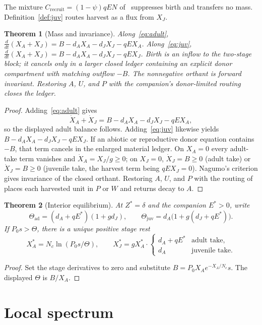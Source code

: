 \documentclass[11pt]{article}
\newtheorem{theorem}{Theorem}
\theoremstyle{definition}
\begin{document}
The mixture $C_{\mathrm{recruit}}=(1-\psi)qEN$ of~\cite{paperI} suppresses birth and transfers no mass. Definition~\ref{def:juv} routes harvest as a flux from $X_J$.

\begin{theorem}[Mass and invariance]
\label{thm:mass}
Along~\eqref{eq:adult}, $\frac{d}{dt}(X_A+X_J)=B-d_A X_A-d_J X_J-qEX_A$. Along~\eqref{eq:juv}, $\frac{d}{dt}(X_A+X_J)=B-d_A X_A-d_J X_J-qEX_J$. Birth is an inflow to the two-stage block; it cancels only in a larger closed ledger containing an explicit donor compartment with matching outflow $-B$. The nonnegative orthant is forward invariant. Restoring $A$, $U$, and $P$ with the companion's donor-limited routing closes the ledger.
\end{theorem}

\begin{proof}
Adding~\eqref{eq:adult} gives
\[
\dot X_A+\dot X_J=B-d_A X_A-d_J X_J-qEX_A,
\]
so the displayed adult balance follows. Adding~\eqref{eq:juv} likewise yields $B-d_A X_A-d_J X_J-qEX_J$. If an abiotic or reproductive donor equation contains $-B$, that term cancels in the enlarged material ledger. On $X_A=0$ every adult-take term vanishes and $\dot X_A=X_J/g\ge 0$; on $X_J=0$, $\dot X_J=B\ge 0$ (adult take) or $\dot X_J=B\ge 0$ (juvenile take, the harvest term being $qEX_J=0$). Nagumo's criterion \cite{nagumo1942} gives invariance of the closed orthant. Restoring $A$, $U$, and $P$ with the routing of~\cite{paperI} places each harvested unit in $P$ or $W$ and returns decay to $A$.
\end{proof}

\begin{theorem}[Interior equilibrium]
\label{thm:eq}
At $Z^*=\delta$ and the companion $E^*>0$, write
\[
\Theta_{\mathrm{ad}}=(d_A+qE^*)(1+gd_J),\qquad
\Theta_{\mathrm{juv}}=d_A\bigl(1+g(d_J+qE^*)\bigr).
\]
If $P_0 s>\Theta$, there is a unique positive stage rest
\[
X_A^*=N_c\ln(P_0 s/\Theta),\qquad
X_J^*=g X_A^*\cdot
\begin{cases}
d_A+qE^* & \text{adult take},\\
d_A & \text{juvenile take}.
\end{cases}
\]
\end{theorem}

\begin{proof}
Set the stage derivatives to zero and substitute $B=P_0 X_A e^{-X_A/N_c}s$. The displayed $\Theta$ is $B/X_A$.
\end{proof}

\section{Local spectrum}
\end{document}
